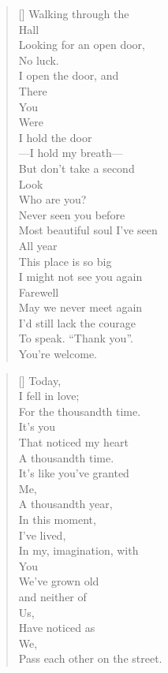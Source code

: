 \documentclass{article}
\begin{document}
\settowidth{\versewidth}{Than Tycho Brahe, or Erra Pater:}
\begin{verse}[\versewidth]
Walking through the \\
Hall \\
Looking for an open door, \\
No luck. \\
I open the door, and\\
There\\
You\\
Were\\
I hold the door\\
––I hold my breath––\\
But don't take a second\\
Look\\
Who are you?\\
Never seen you before\\
Most beautiful soul I've seen\\
All year\\
This place is so big\\
I might not see you again\\
Farewell\\
May we never meet again\\
I'd still lack the courage\\
To speak. ``Thank you''.\\

You're welcome.\\
\end{verse}

\newpage

\settowidth{\versewidth}{Than Tycho Brahe, or Erra Pater:}
\begin{verse}[\versewidth]
Today, \\
I fell in love; \\
For the thousandth time. \\
It's you \\
That noticed my heart \\
A thousandth time. \\
It's like you've granted \\
Me, \\
A thousandth year, \\
In this moment, \\
I've lived, \\
In my, imagination, with \\
You \\
We've grown old \\
and neither of \\
Us, \\
Have noticed as \\
We, \\
Pass each other on the street. \\
\end{verse}
\end{document}
